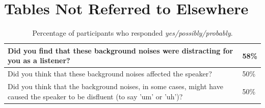 \documentclass[a4paper,man,natbib]{apa6}
\begin{document}

%


\appendix
\section{Tables Not Referred to Elsewhere}



\begin{table}[ht]
\centering
\begin{tabularx}{\linewidth}{|X|X|}
	\hline
Did you find that these background noises were distracting for you as a listener? & 58\%\\ 
   \hline
Did you think that these background noises affected the speaker? & 50\%\\
   \hline
Did you think that the background noises, in some cases, might have caused the speaker to be disfluent (to say 'um' or 'uh')? & 50\%\\
   \hline
\end{tabularx}
\caption{Percentage of participants who responded \textit{yes/possibly/probably}.}
\label{table:questions}
\end{table}
\end{document}
